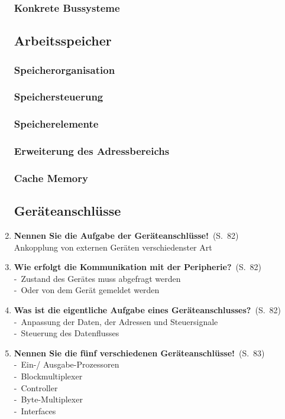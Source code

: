 \documentclass[a4paper,12pt]{article}
\newcommand{\question}[3]{\pagebreak[3]\item {\textbf{#1?}}\ (S.\ #2)#3}
\newcommand{\statement}[3]{\pagebreak[3]\item {\textbf{#1!}}\ (S.\ #2)#3}
\newcommand{\catchword}[1]{\\-\ #1}
\newcommand{\normaltext}[1]{\\#1}
\newcommand{\page}[1]{#1}
\begin{document}
\begin{enumerate}
  \subsubsection{Konkrete Bussysteme}

  \subsection{Arbeitsspeicher}

  \subsubsection{Speicherorganisation}

  \subsubsection{Speichersteuerung}

  \subsubsection{Speicherelemente}

  \subsubsection{Erweiterung des Adressbereichs}

  \subsubsection{Cache Memory}

  \subsection{Geräteanschlüsse}

  \statement{Nennen Sie die Aufgabe der Geräteanschlüsse}{\page{82}}
  {
    \normaltext{Ankopplung von externen Geräten verschiedenster Art}
  }

  \question{Wie erfolgt die Kommunikation mit der Peripherie}{\page{82}}
  {
    \catchword{Zustand des Gerätes muss abgefragt werden}
    \catchword{Oder von dem Gerät gemeldet werden}
  }

  \question{Was ist die eigentliche Aufgabe eines Geräteanschlusses}{\page{82}}
  {
    \catchword{Anpassung der Daten, der Adressen und Steuersignale}
    \catchword{Steuerung des Datenflusses}
  }

  \statement{Nennen Sie die fünf verschiedenen Geräteanschlüsse}{\page{83}}
  {
    \catchword{Ein-/ Ausgabe-Prozessoren}
    \catchword{Blockmultiplexer}
    \catchword{Controller}
    \catchword{Byte-Multiplexer}
    \catchword{Interfaces}
  }


\end{enumerate}
\end{document}
